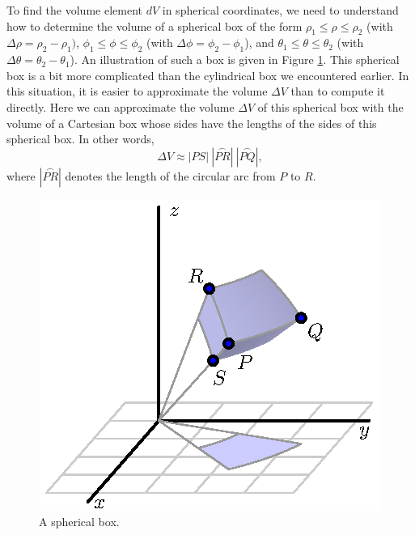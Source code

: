 \begin{activity} \label{A:11.8.8} To find the volume element $dV$ in spherical coordinates, we need to understand how to determine the volume of a spherical box of the form $\rho_1 \leq \rho \leq \rho_2$ (with $\Delta \rho = \rho_2-\rho_1)$, $\phi_1 \leq \phi \leq \phi_2$ (with $\Delta \phi = \phi_2-\phi_1$), and $\theta_1 \leq \theta \leq \theta_2$ (with $\Delta \theta = \theta_2-\theta_1$). An illustration of such a box is given in Figure \ref{F:11.8.Spherical_Vol_Element}. This spherical box is a bit more complicated than the cylindrical box we encountered earlier. In this situation, it is easier to approximate the volume $\Delta V$ than to compute it directly. Here we can approximate the volume $\Delta V$ of this spherical box with the volume of a Cartesian box whose sides have the lengths of the sides of this spherical box. In other words,
       \[\Delta V \approx |PS| \ |\overset{\frown}{PR}| \ |\overset{\frown}{PQ}|,\]
  where $ |\overset{\frown}{PR}|$ denotes the length of the circular arc from $P$ to $R$.
\begin{figure}[ht]
\begin{center}
\begin{minipage}{2.5in}
\begin{center}
  \includegraphics{figures/fig_11_8_spherical_box.eps}
\end{center}
\caption{A spherical box.}
\label{F:11.8.Spherical_Vol_Element}
\end{minipage} \hspace{0.5in}

\end{center}
\end{figure}
\end{activity}
